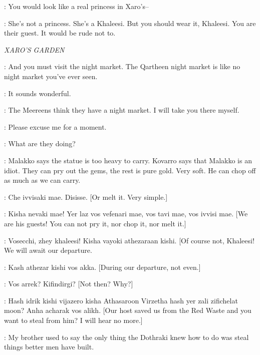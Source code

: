 \DOREAH: You would look like a real princess in Xaro's-- 

\IRRI: She's not a princess. She's a Khaleesi. But you should wear it, Khaleesi. You are their guest. It would be rude not to. 


\scene

\textit{XARO'S GARDEN} 


\QARTHEENWOMAN: And you must visit the night market. The Qartheen night market is like no night market you've ever seen. 

\DAENERYS: It sounds wonderful. 

\QARTHEENWOMAN: The Meereens think they have a night market. I will take you there myself. 


\DAENERYS: Please excuse me for a moment. 


\DAENERYS: What are they doing? 

\JORAH: Malakko says the statue is too heavy to carry. Kovarro says that Malakko is an idiot. They can pry out the gems, the rest is pure gold. Very soft. He can chop off as much as we can carry. 

\KOVARRO: Che ivvisaki mae. Disisse. [Or melt it. Very simple.] 

\DAENERYS: Kisha nevaki mae! Yer laz vos vefenari mae, vos tavi mae, vos ivvisi mae. [We are his guests! You can not pry it, nor chop it, nor melt it.] 

\KOVARRO: Vosecchi, zhey khaleesi! Kisha vayoki athezaraan kishi. [Of course not, Khaleesi! We will await our departure. 

\DAENERYS: Kash athezar kishi vos akka. [During our departure, not even.] 

\KOVARRO: Vos arrek? Kifindirgi? [Not then? Why?] 

\DAENERYS: Hash idrik kishi vijazero kisha Athasaroon Virzetha hash yer zali zifichelat moon? Anha acharak vos alikh. [Our host saved us from the Red Waste and you want to steal from him? I will hear no more.] 


\DAENERYS: My brother used to say the only thing the Dothraki knew how to do was steal things better men have built. 


